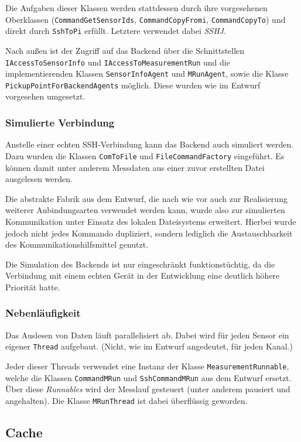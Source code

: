 \documentclass[parskip=full]{scrartcl}
\begin{document}
Die Aufgaben dieser Klassen werden stattdessen durch ihre vorgesehenen Oberklassen (\verb:CommandGetSensorIds:, \verb:CommandCopyFromi:, \verb:CommandCopyTo:) und direkt durch \verb:SshToPi: erfüllt. Letztere verwendet dabei \textit{SSHJ}.

Nach außen ist der Zugriff auf das Backend über die Schnittstellen \verb:IAccessToSensorInfo: und \verb:IAccessToMeasurementRun: und die implementierenden Klassen \verb:SensorInfoAgent: und \verb:MRunAgent:, sowie die Klasse \verb:PickupPointForBackendAgents: möglich. Diese wurden wie im Entwurf vorgesehen umgesetzt.

\subsubsection{Simulierte Verbindung}

Anstelle einer echten SSH-Verbindung kann das Backend auch simuliert werden. Dazu wurden die Klassen \verb:ComToFile: und \verb:FileCommandFactory: eingeführt. Es können damit unter anderem Messdaten aus einer zuvor erstellten Datei ausgelesen werden.

Die abstrakte Fabrik aus dem Entwurf, die nach wie vor auch zur Realisierung weiterer Anbindungsarten verwendet werden kann, wurde also zur simulierten Kommunikation unter Einsatz des lokalen Dateisystems erweitert. Hierbei wurde jedoch nicht jedes Kommando dupliziert, sondern lediglich die Austauschbarkeit des Kommunikationshilfsmittel genutzt. 

Die Simulation des Backends ist nur eingeschränkt funktionstüchtig, da die Verbindung mit einem echten Gerät in der Entwicklung eine deutlich höhere Priorität hatte.

\subsubsection{Nebenläufigkeit}

Das Auslesen von Daten läuft parallelisiert ab. Dabei wird für jeden Sensor ein eigener \verb:Thread: aufgebaut. (Nicht, wie im Entwurf angedeutet, für jeden Kanal.)

Jeder dieser Threads verwendet eine Instanz der Klasse \verb:MeasurementRunnable:, welche die Klassen \verb:CommandMRun: und \verb:SshCommandMRun: aus dem Entwurf ersetzt. Über diese \textit{Runnables} wird der Messlauf gesteuert (unter anderem pausiert und angehalten). Die Klasse \verb:MRunThread: ist dabei überflüssig geworden.

\subsection{Cache}
\end{document}
